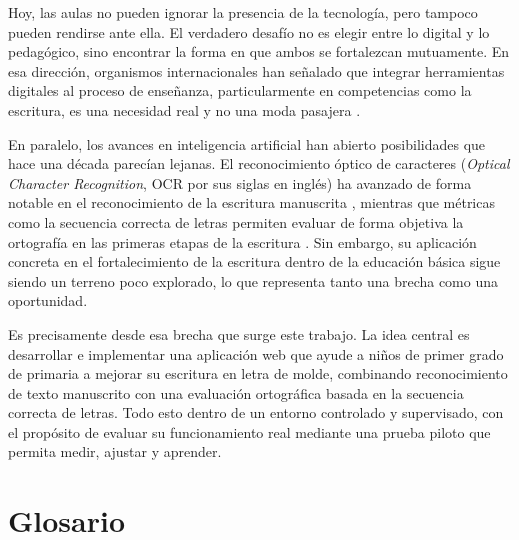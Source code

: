 \documentclass[12pt]{article}
\begin{document}
Hoy, las aulas no pueden ignorar la presencia de la tecnología, pero tampoco pueden rendirse ante
ella. El verdadero desafío no es elegir entre lo digital y lo pedagógico, sino encontrar la forma en que
ambos se fortalezcan mutuamente. En esa dirección, organismos internacionales han señalado que integrar
herramientas digitales al proceso de enseñanza, particularmente en competencias como la escritura,
es una necesidad real y no una moda pasajera \cite{unesco2022tech}.

En paralelo, los avances en inteligencia artificial han abierto posibilidades que hace una década
parecían lejanas. El reconocimiento óptico de caracteres (\textit{Optical Character Recognition}, OCR por sus siglas en inglés) ha avanzado de forma notable en el reconocimiento de la escritura
manuscrita \cite{smith2007overview}, mientras que métricas como la secuencia correcta de letras permiten evaluar de forma objetiva la ortografía en las primeras etapas de la escritura \cite{treiman2016measures}.
Sin embargo, su aplicación concreta en el fortalecimiento de la escritura dentro de la educación básica
sigue siendo un terreno poco explorado, lo que representa tanto una brecha como una oportunidad.

Es precisamente desde esa brecha que surge este trabajo. La idea central es desarrollar e implementar
una aplicación web que ayude a niños de primer grado de primaria a mejorar su escritura en
letra de molde, combinando reconocimiento de texto manuscrito con una evaluación ortográfica
basada en la secuencia correcta de letras. Todo esto dentro de un entorno controlado y supervisado, con el propósito de evaluar
su funcionamiento real mediante una prueba piloto que permita medir, ajustar y aprender.








\newpage
\renewcommand{\refname}{Glosario}

\section*{Glosario}
\end{document}
